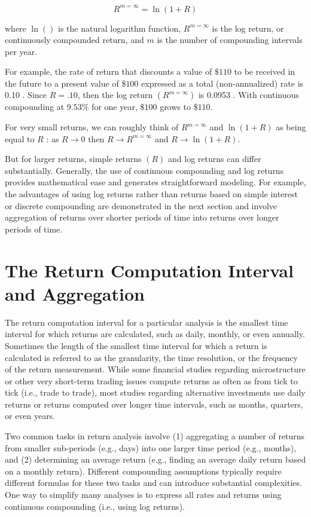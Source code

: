 \documentclass[11pt]{article}
\begin{document}
\begin{equation*}
R^{m=\infty}=\ln (1+R) \tag{1}
\end{equation*}


where $\ln ()$ is the natural logarithm function, $R^{m=\infty}$ is the log return, or continuously compounded return, and $m$ is the number of compounding intervals per year.

For example, the rate of return that discounts a value of $\$ 110$ to be received in the future to a present value of $\$ 100$ expressed as a total (non-annualized) rate is 0.10 . Since $R=.10$, then the log return $\left(R^{m=\infty}\right)$ is 0.0953 . With continuous compounding at $9.53 \%$ for one year, $\$ 100$ grows to $\$ 110$.

For very small returns, we can roughly think of $R^{m=\infty}$ and $\ln (1+R)$ as being equal to $R$ : as $R \rightarrow 0$ then $R \rightarrow R^{m=\infty}$ and $R \rightarrow \ln (1+R)$.

But for larger returns, simple returns $(R)$ and log returns can differ substantially. Generally, the use of continuous compounding and log returns provides mathematical ease and generates straightforward modeling. For example, the advantages of using log returns rather than returns based on simple interest or discrete compounding are demonstrated in the next section and involve aggregation of returns over shorter periods of time into returns over longer periods of time.

\section*{The Return Computation Interval and Aggregation}
The return computation interval for a particular analysis is the smallest time interval for which returns are calculated, such as daily, monthly, or even annually. Sometimes the length of the smallest time interval for which a return is calculated is referred to as the granularity, the time resolution, or the frequency of the return measurement. While some financial studies regarding microstructure or other very short-term trading issues compute returns as often as from tick to tick (i.e., trade to trade), most studies regarding alternative investments use daily returns or returns computed over longer time intervals, such as months, quarters, or even years.

Two common tasks in return analysis involve (1) aggregating a number of returns from smaller sub-periods (e.g., days) into one larger time period (e.g., months), and (2) determining an average return (e.g., finding an average daily return based on a monthly return). Different compounding assumptions typically require different formulas for these two tasks and can introduce substantial complexities. One way to simplify many analyses is to express all rates and returns using continuous compounding (i.e., using log returns).
\end{document}
